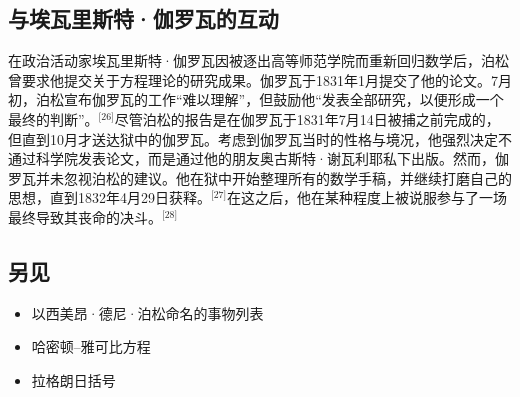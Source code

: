 \subsection{与埃瓦里斯特·伽罗瓦的互动}
在政治活动家埃瓦里斯特·伽罗瓦因被逐出高等师范学院而重新回归数学后，泊松曾要求他提交关于方程理论的研究成果。伽罗瓦于1831年1月提交了他的论文。7月初，泊松宣布伽罗瓦的工作“难以理解”，但鼓励他“发表全部研究，以便形成一个最终的判断”。\(^\text{[26]}\)尽管泊松的报告是在伽罗瓦于1831年7月14日被捕之前完成的，但直到10月才送达狱中的伽罗瓦。考虑到伽罗瓦当时的性格与境况，他强烈决定不通过科学院发表论文，而是通过他的朋友奥古斯特·谢瓦利耶私下出版。然而，伽罗瓦并未忽视泊松的建议。他在狱中开始整理所有的数学手稿，并继续打磨自己的思想，直到1832年4月29日获释。\(^\text{[27]}\)在这之后，他在某种程度上被说服参与了一场最终导致其丧命的决斗。\(^\text{[28]}\)
\subsection{另见}
\begin{itemize}
\item 以西美昂·德尼·泊松命名的事物列表
\item 哈密顿–雅可比方程
\item 拉格朗日括号
\end{itemize}